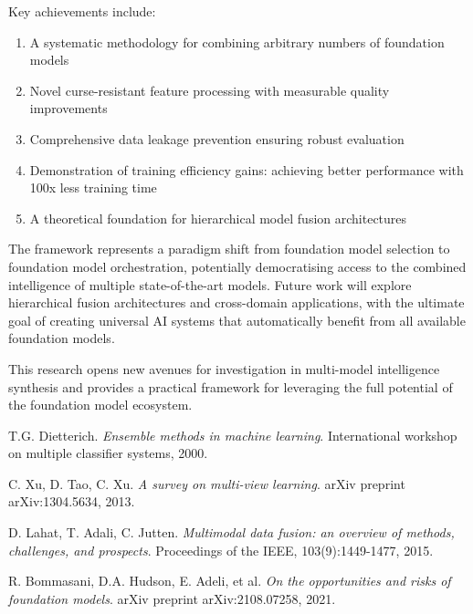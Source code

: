\documentclass[11pt,a4paper]{article}
\begin{document}
Key achievements include:

\begin{enumerate}
    \item A systematic methodology for combining arbitrary numbers of foundation models
    \item Novel curse-resistant feature processing with measurable quality improvements
    \item Comprehensive data leakage prevention ensuring robust evaluation
    \item Demonstration of training efficiency gains: achieving better performance with 100x less training time
    \item A theoretical foundation for hierarchical model fusion architectures
\end{enumerate}

The framework represents a paradigm shift from foundation model selection to foundation model orchestration, potentially democratising access to the combined intelligence of multiple state-of-the-art models. Future work will explore hierarchical fusion architectures and cross-domain applications, with the ultimate goal of creating universal AI systems that automatically benefit from all available foundation models.

This research opens new avenues for investigation in multi-model intelligence synthesis and provides a practical framework for leveraging the full potential of the foundation model ecosystem.


\begin{thebibliography}{9}

T.G. Dietterich.
\textit{Ensemble methods in machine learning}.
International workshop on multiple classifier systems, 2000.

C. Xu, D. Tao, C. Xu.
\textit{A survey on multi-view learning}.
arXiv preprint arXiv:1304.5634, 2013.

D. Lahat, T. Adali, C. Jutten.
\textit{Multimodal data fusion: an overview of methods, challenges, and prospects}.
Proceedings of the IEEE, 103(9):1449-1477, 2015.

R. Bommasani, D.A. Hudson, E. Adeli, et al.
\textit{On the opportunities and risks of foundation models}.
arXiv preprint arXiv:2108.07258, 2021.

\end{thebibliography}
\end{document}
